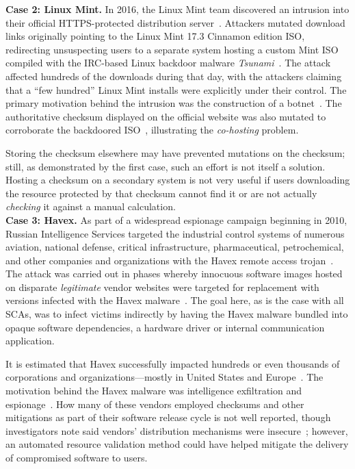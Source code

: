 \noindent\textbf{Case 2: Linux Mint.} In 2016, the Linux Mint team discovered an
intrusion into their official HTTPS-protected distribution
server~\cite{SCA-MINT1}. Attackers mutated download links originally pointing to
the Linux Mint 17.3 Cinnamon edition ISO, redirecting unsuspecting users to a
separate system hosting a custom Mint ISO compiled with the IRC-based Linux
backdoor malware \emph{Tsunami}~\cite{SCA-MINT2}. The attack affected hundreds
of the downloads during that day, with the attackers claiming that a ``few
hundred'' Linux Mint installs were explicitly under their control. The primary
motivation behind the intrusion was the construction of a
botnet~\cite{SCA-MINT3}. The authoritative checksum displayed on the official
website was also mutated to corroborate the backdoored ISO~\cite{SCA-MINT3},
illustrating the \emph{co-hosting} problem.

Storing the checksum elsewhere may have prevented mutations on the checksum;
still, as demonstrated by the first case, such an effort is not itself a
solution. Hosting a checksum on a secondary system is not very useful if users
downloading the resource protected by that checksum cannot find it or are not
actually \emph{checking} it against a manual calculation. \\

\noindent\textbf{Case 3: Havex.} As part of a widespread espionage campaign
beginning in 2010, Russian Intelligence Services targeted the industrial control
systems of numerous aviation, national defense, critical infrastructure,
pharmaceutical, petrochemical, and other companies and organizations with the
Havex remote access trojan~\cite{SCA-HAVEX1, SCA-HAVEX2}. The attack was carried
out in phases whereby innocuous software images hosted on disparate
\emph{legitimate} vendor websites were targeted for replacement with versions
infected with the Havex malware~\cite{SCA-HAVEX2}. The goal here, as is the case
with all SCAs, was to infect victims indirectly by having the Havex malware
bundled into opaque software dependencies, \ie a hardware driver or internal
communication application.

It is estimated that Havex successfully impacted hundreds or even thousands of
corporations and organizations---mostly in United States and
Europe~\cite{SCA-HAVEX2}. The motivation behind the Havex malware was
intelligence exfiltration and espionage~\cite{SCA-HAVEX1}. How many of these
vendors employed checksums and other mitigations as part of their software
release cycle is not well reported, though investigators note said vendors'
distribution mechanisms were insecure~\cite{SCA-HAVEX2}; however, an automated
resource validation method could have helped mitigate the delivery of
compromised software to users. \\

